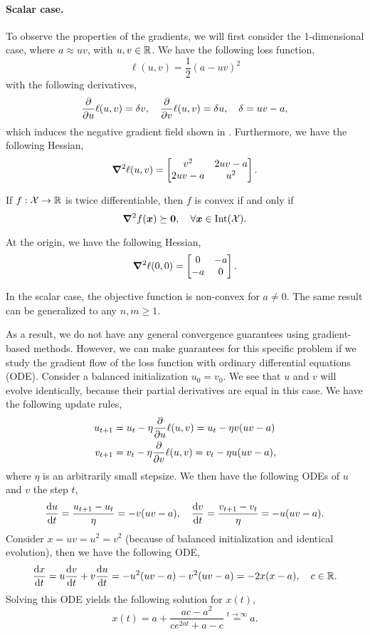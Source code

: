 \paragraph{Scalar case.}

To observe the properties of the gradients, we will first consider the 1-dimensional case, where $a
    \approx uv$, with $u,v\in\mathbb{R}$. We have the following loss function, \[
    \ell(u,v) = \frac{1}{2} (a - uv)^2
\]
with the following derivatives, \[
    \pdv*{\ell(u,v)}{u} = \delta v, \quad \pdv*{\ell(u,v)}{v} = \delta u, \quad \delta = uv - a,
\]
which induces the negative gradient field shown in . Furthermore, we have the
following Hessian, \[
    \bm{\nabla}^2_{\! } \ell(u,v) = \begin{bmatrix}
        v^2     & 2uv - a \\
        2uv - a & u^2
    \end{bmatrix}.
\]

\begin{lemma}
    If $f: \mathcal{X} \to \mathbb{R}$ is twice differentiable, then $f$ is convex if and only if \[
        \bm{\nabla}^2_{\! } f(\bm{x}) \succeq \bm{0}, \quad \forall \bm{x} \in \mathrm{Int}(\mathcal{X}).
    \]
\end{lemma}

At the origin, we have the following Hessian, \[
    \bm{\nabla}^2_{\! } \ell(0,0) = \begin{bmatrix}
        0  & -a \\
        -a & 0
    \end{bmatrix}.
\]

\begin{important}
    In the scalar case, the objective function is non-convex for $a \neq 0$. The same result can
    be generalized to any $n,m \geq 1$.
\end{important}

As a result, we do not have any general convergence guarantees using gradient-based methods.
However, we can make guarantees for this specific problem if we study the gradient flow of the loss
function with ordinary differential equations (ODE). Consider a balanced initialization $u_0 =
    v_0$. We see that $u$ and $v$ will evolve identically, because their partial derivatives are equal
in this case. We have the following update rules,
\begin{align*}
    u_{t+1} & = u_t - \eta \pdv*{\ell(u,v)}{u} = u_t - \eta v(uv - a)  \\
    v_{t+1} & = v_t - \eta \pdv*{\ell(u,v)}{v} = v_t - \eta u(uv - a),
\end{align*}
where $\eta$ is an arbitrarily small stepsize. We then have the following ODEs of $u$ and $v$ \wrt the step $t$, \[
    \odv{u}{t} = \frac{u_{t+1} - u_t}{\eta} = -v(uv - a), \quad \odv{v}{t} = \frac{v_{t+1} - v_t}{\eta} = -u(uv - a).
\]
Consider $x = uv = u^2 = v^2$ (because of balanced initialization and identical evolution), then we
have the following ODE, \[
    \odv{x}{t} = u \odv{v}{t} + v \odv{u}{t} = -u^2 (uv - a) - v^2 (uv - a) = -2x(x-a), \quad c \in \R.
\]
Solving this ODE yields the following solution for $x(t)$, \[
    x(t) = a + \frac{ac - a^2}{ce^{2at} + a - c} \overset{t\to\infty}{=} a.
\]

